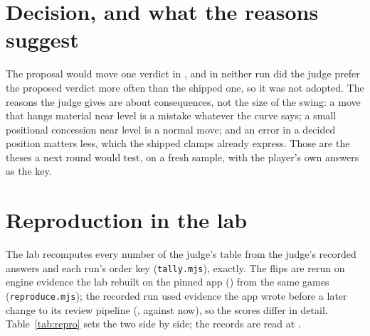 \documentclass[11pt]{article}
\begin{document}
\begin{figure}[!htbp]\ExampleA\caption{\ExampleACaption}\label{fig:exa}\end{figure}
\begin{figure}[!htbp]\ExampleB\caption{\ExampleBCaption}\label{fig:exb}\end{figure}
\begin{figure}[!htbp]\ExampleC\caption{\ExampleCCaption}\label{fig:exc}\end{figure}
\begin{figure}[!htbp]\ExampleD\caption{\ExampleDCaption}\label{fig:exd}\end{figure}

\section{Decision, and what the reasons suggest}

The proposal would move one verdict in \FlipOneIn{}, and in neither run did the judge prefer the
proposed verdict more often than the shipped one, so it was not adopted. The reasons the judge gives are about consequences, not
the size of the swing: a move that hangs material near level is a mistake whatever the curve
says; a small positional concession near level is a normal move; and an error in a decided
position matters less, which the shipped clamps already express. Those are the theses a next
round would test, on a fresh sample, with the player's own answers as the key.

\section{Reproduction in the lab}

The lab recomputes every number of the judge's table from the judge's recorded answers and
each run's order key (\texttt{tally.mjs}), exactly. The flips are rerun on engine evidence
the lab rebuilt on the pinned app (\AppCommit) from the same games
(\texttt{reproduce.mjs}); the recorded run used evidence the app wrote before a later
change to its review pipeline (\EvidenceRecorded, against \EvidenceRerun{} now), so the
scores differ in detail. Table~\ref{tab:repro} sets the two side by side; the records are
read at \RecordsCommit.

\begin{table}[!htbp]
\centering\small
\ReproTable
\caption{The flips as recorded and as rerun in the lab.}
\label{tab:repro}
\end{table}
\end{document}
